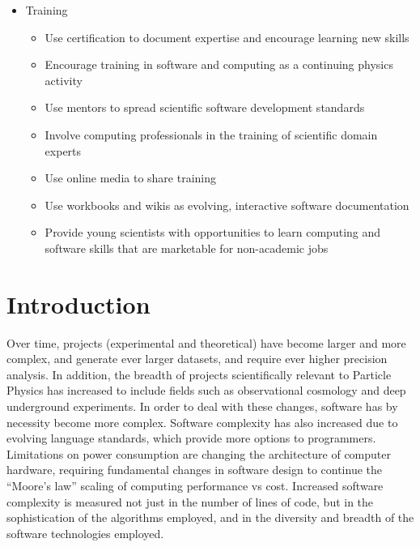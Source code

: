 \begin{itemize}
    \item Training
    \begin{itemize}
        \item Use certification to document expertise and encourage learning new skills
        \item Encourage training in software and computing as a continuing physics activity
        \item Use mentors to spread scientific software development standards
        \item Involve computing professionals in the training of scientific domain experts
        \item Use online media to share training
        \item Use workbooks and wikis as evolving, interactive software documentation
        \item Provide young scientists with opportunities to learn computing and software skills that are marketable for non-academic jobs
    \end{itemize}

\end{itemize}


\section{Introduction}
\label{sec:Intro}

Over time, \HEP projects (experimental and theoretical)
have become larger and more complex, and generate ever larger datasets, and require ever higher
precision analysis.  In addition, the breadth of projects scientifically relevant to Particle Physics has increased to
include fields such as observational cosmology and deep underground experiments.
In order to deal with these changes, \HEP software has by necessity become more complex.
Software complexity has also increased due to evolving language standards, which provide more options to programmers.
Limitations on power consumption are changing the architecture of computer hardware,
requiring fundamental changes in software design to continue the ``Moore's law'' scaling of computing performance vs cost.
Increased software complexity is measured not just in
the number of lines of code, but in the sophistication of the algorithms employed, and in the diversity and
breadth of the software technologies employed.

